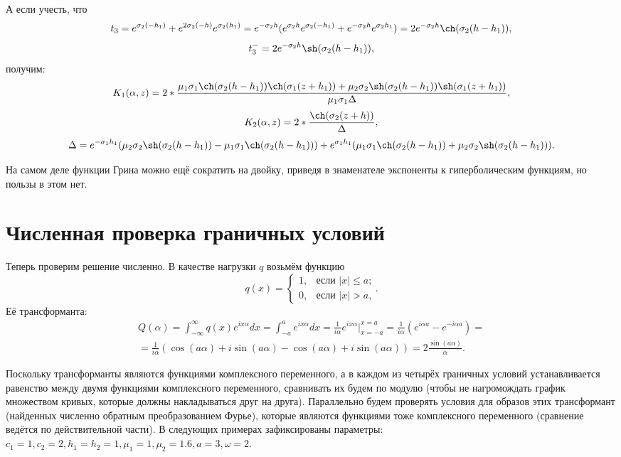 \documentclass[a4paper, 12pt]{article}
\newcommand{\s}[1]{\sigma_{#1}}
\newcommand{\m}[1]{\mu_{#1}}
\newcommand{\E}[2]{e^{#1 #2}}
\begin{document}
А если учесть, что
$$t_3=\E{\s{2}}{(-h_1)}+ \E{2\s{2}}{(-h)} \E{\s{2}}{(h_1)}=e^{-\s{2}h}(e^{\s{2}h}e^{\s{2}(-h_1)}+e^{-\s{2}h}e^{\s{2}h_1})=2e^{-\s{2}h}\ch(\s{2}(h-h_1)),$$
$$t_3^-=2e^{-\s{2}h}\sh(\s{2}(h-h_1)),$$
получим:
$$K_1(\alpha,z)=2*\frac{\m{1}\s{1}\ch(\s{2}(h-h_1))\ch(\s{1}(z+h_1))+\m{2}\s{2}\sh(\s{2}(h-h_1))\sh(\s{1}(z+h_1))}{\mu_1 \sigma_1 \Delta},$$
$$K_2(\alpha,z)=2*\frac{\ch(\s{2}(z+h))}{\Delta},$$
$$\Delta=\E{-\s{1}}{h_1}(\m{2}\s{2}\sh(\s{2}(h-h_1))-\m{1}\s{1}\ch(\s{2}(h-h_1)))+\E{\s{1}}{h_1}(\m{1}\s{1}\ch(\s{2}(h-h_1))+\m{2}\s{2}\sh(\s{2}(h-h_1))) .$$

На самом деле функции Грина можно ещё сократить на двойку, приведя в знаменателе экспоненты к гиперболическим функциям, но пользы в этом нет.

\section{Численная проверка граничных условий}
Теперь проверим решение численно. В качестве нагрузки $q$ возьмём функцию
\[
q(x) =
\begin{cases}
1, & \text{если $|x|\leq a$;} \\
0, & \text{если $|x|>a$,}
\end{cases}.
\]
Её трансформанта:
\begin{multline}
  Q(\alpha)=\int_{-\infty}^{\infty}q(x)e^{ix\alpha} dx=\int_{-a}^{a}e^{ix\alpha} dx=\frac{1}{i\alpha}e^{ix\alpha}|_{x=-a}^{x=a}=\frac{1}{i\alpha}\left(e^{i\alpha a}-e^{-i\alpha a} \right)=\\
=\frac{1}{i\alpha}\left(\cos(a\alpha)+i\sin(a\alpha)-\cos(a\alpha)+i\sin(a\alpha) \right)=2\frac{\sin(a\alpha)}{\alpha} .  
\end{multline}

Поскольку трансформанты являются функциями комплексного переменного, а в каждом из четырёх граничных условий устанавливается равенство между двумя функциями комплексного переменного, сравнивать их будем по модулю (чтобы не нагромождать график множеством кривых, которые должны накладываться друг на друга). Параллельно будем проверять условия для образов этих трансформант (найденных численно обратным преобразованием Фурье), которые являются функциями тоже комплексного переменного (сравнение ведётся по действительной части). В следующих примерах зафиксированы параметры: $c_1=1, c_2=2, h_1=h_2=1, \mu_1=1, \mu_2=1.6, a=3, \omega=2$.
\end{document}
